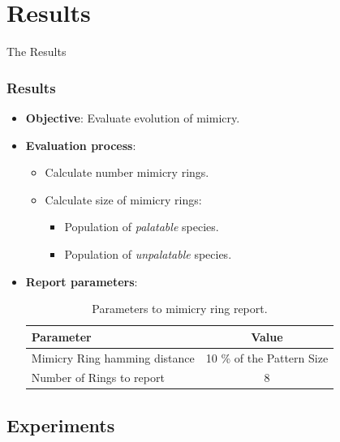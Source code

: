 \section{Results}

\frame
{
	\begin{center}
		\LARGE The Results
	\end{center}
}

\frame
{
	\frametitle{Results}

	\begin{itemize}
	  \item \textbf{Objective}: Evaluate evolution of mimicry.
	  \item \textbf{Evaluation process}:
			\begin{itemize}
			  \item Calculate number mimicry rings.
			  \item Calculate size of mimicry rings:
					\begin{itemize}
					  \item Population of \textit{palatable} species.
					  \item Population of \textit{unpalatable} species.
					\end{itemize}			  
			\end{itemize}
		\item \textbf{Report parameters}:
			\begin{table}
			\centering
			\begin{scriptsize}
			\begin{spacing}{1.5}
			\begin{tabular}{| l | c |}
				\hline
					\textbf{Parameter} & \textbf{Value} \\ \hline
					Mimicry Ring hamming distance & 10 \% of the Pattern Size \\ \hline
					Number of Rings to report & 8 \\
				\hline
			\end{tabular}
			\end{spacing}
			\end{scriptsize}
			\caption{Parameters to mimicry ring report.}
			\label{tab:ring-report-control-parameters}
			\end{table}		
	\end{itemize}
}

\subsection{Experiments}

